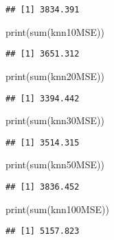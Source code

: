 \documentclass[
]{article}
\newenvironment{Shaded}{\begin{snugshade}}{\end{snugshade}}
\newcommand{\FunctionTok}[1]{\textcolor[rgb]{0.00,0.00,0.00}{#1}}
\newcommand{\NormalTok}[1]{#1}
\begin{document}
\begin{verbatim}
## [1] 3834.391
\end{verbatim}

\begin{Shaded}
\begin{Highlighting}[]
\FunctionTok{print}\NormalTok{(}\FunctionTok{sum}\NormalTok{(knn10MSE))}
\end{Highlighting}
\end{Shaded}

\begin{verbatim}
## [1] 3651.312
\end{verbatim}

\begin{Shaded}
\begin{Highlighting}[]
\FunctionTok{print}\NormalTok{(}\FunctionTok{sum}\NormalTok{(knn20MSE))}
\end{Highlighting}
\end{Shaded}

\begin{verbatim}
## [1] 3394.442
\end{verbatim}

\begin{Shaded}
\begin{Highlighting}[]
\FunctionTok{print}\NormalTok{(}\FunctionTok{sum}\NormalTok{(knn30MSE))}
\end{Highlighting}
\end{Shaded}

\begin{verbatim}
## [1] 3514.315
\end{verbatim}

\begin{Shaded}
\begin{Highlighting}[]
\FunctionTok{print}\NormalTok{(}\FunctionTok{sum}\NormalTok{(knn50MSE))}
\end{Highlighting}
\end{Shaded}

\begin{verbatim}
## [1] 3836.452
\end{verbatim}

\begin{Shaded}
\begin{Highlighting}[]
\FunctionTok{print}\NormalTok{(}\FunctionTok{sum}\NormalTok{(knn100MSE))}
\end{Highlighting}
\end{Shaded}

\begin{verbatim}
## [1] 5157.823
\end{verbatim}
\end{document}
